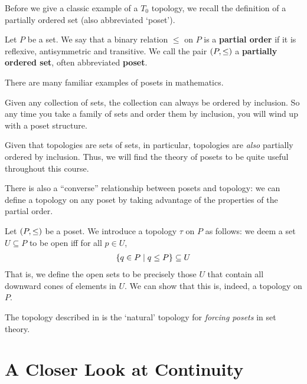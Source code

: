 Before we give a classic example of a $T_0$ topology, we recall the definition of a partially ordered set (also abbreviated `poset').

\begin{boxdefinition}
    Let $P$ be a set. We say that a binary relation $\leq$ on $P$ is a \textbf{partial order} if it is reflexive, antisymmetric and transitive. We call the pair $\left( P, \leq \right)$ a \textbf{partially ordered set}, often abbreviated \textbf{poset}.
\end{boxdefinition}

There are many familiar examples of posets in mathematics.

\begin{boxexample}
    Given any collection of sets, the collection can always be ordered by inclusion. So any time you take a family of sets and order them by inclusion, you will wind up with a poset structure.
\end{boxexample}

Given that topologies are sets of sets, in particular, topologies are \textit{also} partially ordered by inclusion. Thus, we will find the theory of posets to be quite useful throughout this course.

There is also a ``converse'' relationship between posets and topology: we can define a topology on any poset by taking advantage of the properties of the partial order.

\begin{boxexample}\label{Ch1:Eg:Poset_Downward_Cone}
    Let $\left( P, \leq \right)$ be a poset. We introduce a topology $\tau$ on $P$ as follows: we deem a set $U \subseteq P$ to be open iff for all $p \in U$,
    \begin{align*}
        \left\{ q \in P \; \middle\vert \; q \leq P \right\} \subseteq U
    \end{align*}
    That is, we define the open sets to be precisely those $U$ that contain all downward cones of elements in $U$. We can show that this is, indeed, a topology on $P$.
\end{boxexample}

The topology described in  is the `natural' topology for \textit{forcing posets} in set theory.

\section{A Closer Look at Continuity}

